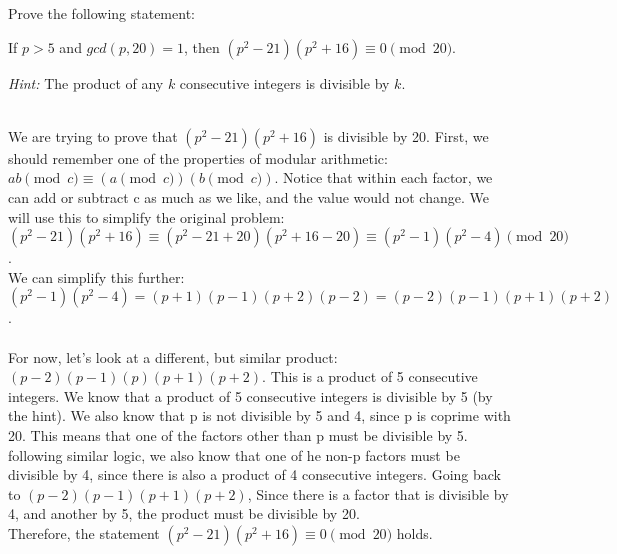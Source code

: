 \documentclass[11pt]{article}
\begin{document}
	

\medskip


\lineacross


\begin{problem} %
	\vspace{0.05in}
    \noindent  Prove the following statement: 
    
    
    \noindent 
    If $p > 5$ and $gcd(p, 20) = 1$,
    then $(p^2 -21)(p^2 +16)\equiv 0 \pmod{20}$.
    
    \vspace{0.1in}
    \noindent  
    \emph{Hint:} 
    The product of any $k$ consecutive integers is divisible by $k$.

\end{problem}


\begin{solution} %
    \\ We are trying to prove that 
    $(p^2 -21)(p^2 +16)$ is divisible by 20. 
    First, we should remember one of the properties
    of modular arithmetic: 
    $ab \pmod{c} \equiv (a\pmod{c})(b\pmod{c})$.
    Notice that within each factor, we can add or subtract
    c as much as we like, and the value would not change.
    We will use this to simplify the original problem:
    \\$(p^2 -21)(p^2 +16)
    \equiv (p^2 -21 + 20)(p^2 +16 - 20) 
    \equiv (p^2 -1)(p^2 -4) \pmod{20}$.
    \\ We can simplify this further: 
    $(p^2 -1)(p^2 -4) = (p+1)(p-1)(p+2)(p-2)
    = (p-2)(p-1)(p+1)(p+2)$.
    \\ \\ For now, let's look at a different, but similar
    product: $(p-2)(p-1)(p)(p+1)(p+2)$. 
    This is a product of 5 consecutive integers.
    We know that a product of 5 consecutive integers
    is divisible by 5 (by the hint). We also know that
    p is not divisible by 5 and 4, since p is coprime
    with 20. This means that one of the factors
    other than p must be divisible by 5. following
    similar logic, we also know that one of he non-p 
    factors must be divisible by 4, since there is also
    a product of 4 consecutive integers.
    Going back to $(p-2)(p-1)(p+1)(p+2)$, 
    Since there  is a factor that is divisible by 4, 
    and another by 5, the product must be 
    divisible by 20. 
    \\ Therefore, the statement
    $(p^2 -21)(p^2 +16)\equiv 0 \pmod{20}$
    holds.


\end{solution}
\end{document}
